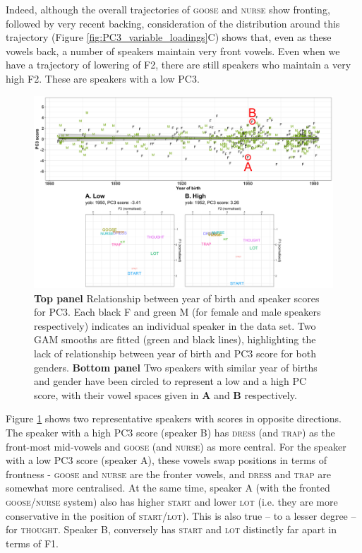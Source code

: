 \documentclass[review]{elsarticle} %
\begin{document}
Indeed, although the overall trajectories of \textsc{goose} and \textsc{nurse} show fronting, followed by very recent backing, consideration of the distribution around this trajectory (Figure \ref{fig:PC3_variable_loadings}C) shows that, even as these vowels back, a number of speakers maintain very front vowels.  Even when we have a trajectory of lowering of F2, there are still speakers who maintain a very high F2.  These are speakers with a low PC3.

\begin{figure}[!t]
\includegraphics[width=\textwidth]{Figures/PC3_speaker_loadings_example.png}
\caption{\textbf{Top panel} Relationship between year of birth and speaker scores for PC3. Each black F and green M (for female and male speakers respectively) indicates an individual speaker in the data set. Two GAM smooths are fitted (green and black lines), highlighting the lack of relationship between year of birth and PC3 score for both genders. \textbf{Bottom panel} Two speakers with similar year of births and gender have been circled to represent a low and a high PC score, with their vowel spaces given in \textbf{A} and \textbf{B} respectively.}
\label{fig:PC3_speaker_loadings}
\end{figure}

Figure \ref{fig:PC3_speaker_loadings} shows two representative speakers with scores in opposite directions.  The speaker with a high PC3 score (speaker B) has \textsc{dress} (and \textsc{trap}) as the front-most mid-vowels and \textsc{goose} (and \textsc{nurse}) as more central.  For the speaker with a low PC3 score (speaker A), these vowels swap positions in terms of frontness - \textsc{goose} and \textsc{nurse} are the fronter vowels, and \textsc{dress} and \textsc{trap} are somewhat more centralised. At the same time, speaker A (with the fronted \textsc{goose}/\textsc{nurse} system) also has higher \textsc{start} and lower \textsc{lot} (i.e. they are more conservative in the position of \textsc{start}/\textsc{lot}).  This is also true -- to a lesser degree -- for \textsc{thought}. Speaker B, conversely has \textsc{start} and \textsc{lot} distinctly far apart in terms of F1.
\end{document}
